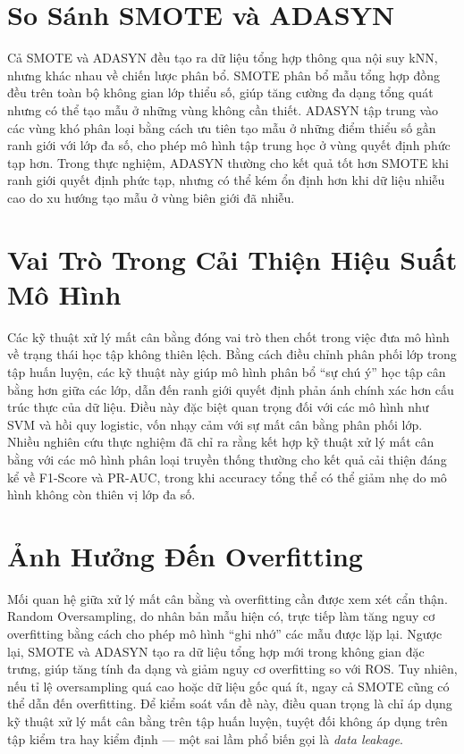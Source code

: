 \section{So Sánh SMOTE và ADASYN}

Cả SMOTE và ADASYN đều tạo ra dữ liệu tổng hợp thông qua nội suy kNN, nhưng khác nhau về chiến lược phân bổ. SMOTE phân bổ mẫu tổng hợp đồng đều trên toàn bộ không gian lớp thiểu số, giúp tăng cường đa dạng tổng quát nhưng có thể tạo mẫu ở những vùng không cần thiết. ADASYN tập trung vào các vùng khó phân loại bằng cách ưu tiên tạo mẫu ở những điểm thiểu số gần ranh giới với lớp đa số, cho phép mô hình tập trung học ở vùng quyết định phức tạp hơn. Trong thực nghiệm, ADASYN thường cho kết quả tốt hơn SMOTE khi ranh giới quyết định phức tạp, nhưng có thể kém ổn định hơn khi dữ liệu nhiễu cao do xu hướng tạo mẫu ở vùng biên giới đã nhiễu.

\section{Vai Trò Trong Cải Thiện Hiệu Suất Mô Hình}

Các kỹ thuật xử lý mất cân bằng đóng vai trò then chốt trong việc đưa mô hình về trạng thái học tập không thiên lệch. Bằng cách điều chỉnh phân phối lớp trong tập huấn luyện, các kỹ thuật này giúp mô hình phân bổ ``sự chú ý'' học tập cân bằng hơn giữa các lớp, dẫn đến ranh giới quyết định phản ánh chính xác hơn cấu trúc thực của dữ liệu. Điều này đặc biệt quan trọng đối với các mô hình như SVM và hồi quy logistic, vốn nhạy cảm với sự mất cân bằng phân phối lớp. Nhiều nghiên cứu thực nghiệm đã chỉ ra rằng kết hợp kỹ thuật xử lý mất cân bằng với các mô hình phân loại truyền thống thường cho kết quả cải thiện đáng kể về F1-Score và PR-AUC, trong khi accuracy tổng thể có thể giảm nhẹ do mô hình không còn thiên vị lớp đa số.

\section{Ảnh Hưởng Đến Overfitting}

Mối quan hệ giữa xử lý mất cân bằng và overfitting cần được xem xét cẩn thận. Random Oversampling, do nhân bản mẫu hiện có, trực tiếp làm tăng nguy cơ overfitting bằng cách cho phép mô hình ``ghi nhớ'' các mẫu được lặp lại. Ngược lại, SMOTE và ADASYN tạo ra dữ liệu tổng hợp mới trong không gian đặc trưng, giúp tăng tính đa dạng và giảm nguy cơ overfitting so với ROS. Tuy nhiên, nếu tỉ lệ oversampling quá cao hoặc dữ liệu gốc quá ít, ngay cả SMOTE cũng có thể dẫn đến overfitting. Để kiểm soát vấn đề này, điều quan trọng là chỉ áp dụng kỹ thuật xử lý mất cân bằng trên tập huấn luyện, tuyệt đối không áp dụng trên tập kiểm tra hay kiểm định --- một sai lầm phổ biến gọi là \textit{data leakage}.

